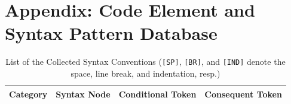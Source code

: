 \appendix

\section{Appendix: Code Element and Syntax Pattern Database}\label{app:database}


\begin{table}[!t]
    \centering
    \footnotesize
    \caption{List of the Collected Syntax Conventions (\texttt{[SP]}, \texttt{[BR]}, and \texttt{[IND]} denote the space, line break, and indentation, resp.)}\label{table:syntax_full}
    \vspace{-10pt}
    \begin{tabular}{m{2.8cm}m{2cm}m{6.5cm}m{5cm}}
        \toprule
        \textbf{Category} &\textbf{Syntax Node}  & \textbf{Conditional Token} & \textbf{Consequent Token} \\
        \midrule
        

\end{tabular}
\end{table}
